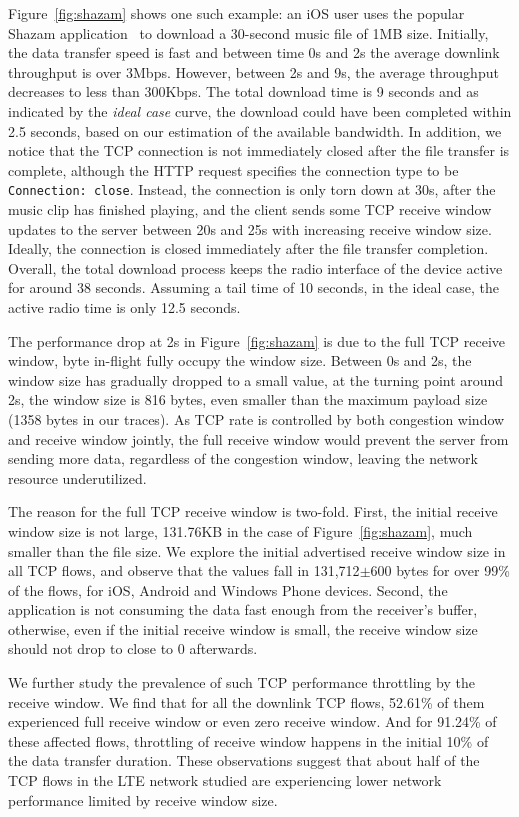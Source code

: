 Figure~\ref{fig:shazam} shows one such example: an iOS user uses the popular Shazam application~\cite{shazam} to download a 30-second music file of 1MB size. Initially, the data transfer speed is fast and between time 0s and 2s the average downlink throughput is over 3Mbps. However, between 2s and 9s, the average throughput decreases to less than 300Kbps. The total download time is 9 seconds and as indicated by the \emph{ideal case} curve, the download could have been completed within 2.5 seconds, based on our estimation of the available bandwidth. In addition, we notice that the TCP connection is not immediately closed after the file transfer is complete, although the HTTP request specifies the connection type to be \texttt{Connection: close}. Instead, the connection is only torn down at 30s, after the music clip has finished playing, and the client sends some TCP receive window updates to the server between 20s and 25s with increasing receive window size. Ideally, the connection is closed immediately after the file transfer completion. Overall, the total download process keeps the radio interface of the device active for around 38 seconds. Assuming a tail time of 10 seconds, in the ideal case, the active radio time is only 12.5 seconds.

The performance drop at 2s in Figure~\ref{fig:shazam} is due to the full TCP receive window, \ie byte in-flight fully occupy the window size. Between 0s and 2s, the window size has gradually dropped to a small value, \eg at the turning point around 2s, the window size is 816 bytes, even smaller than the maximum payload size  (1358 bytes in our traces). As TCP rate is controlled by both congestion window and receive window jointly, the full receive window would prevent the server from sending more data, regardless of the congestion window, leaving the network resource underutilized.

The reason for the full TCP receive window is two-fold. First, the initial receive window size is not large, \eg 131.76KB in the case of Figure~\ref{fig:shazam}, much smaller than the file size. We explore the initial advertised receive window size in all TCP flows, and observe that the values fall in 131,712$\pm$600 bytes for over 99\% of the flows, for iOS, Android and Windows Phone devices. Second, the application is not consuming the data fast enough from the receiver's buffer, otherwise, even if the initial receive window is small, the receive window size should not drop to close to 0 afterwards.

We further study the prevalence of such TCP performance throttling by the receive window. We find that for all the downlink TCP flows, 52.61\% of them experienced full receive window or even zero receive window. And for 91.24\% of these affected flows, throttling of receive window happens in the initial 10\% of the data transfer duration. These observations suggest that about half of the TCP flows in the LTE network studied are experiencing lower network performance limited by receive window size.


